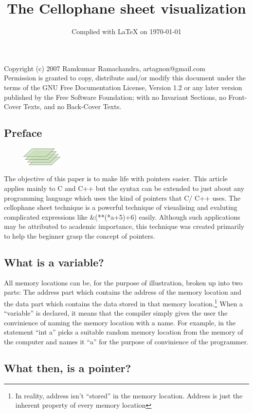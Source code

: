 \documentclass[10pt,twoside]{article}
\begin{document}
\title{The Cellophane sheet visualization}
\date{Complied with \LaTeX{} on \today}
\maketitle
\begin{center}
{\scriptsize Copyright (c) 2007 Ramkumar Ramachandra,
artagnon@gmail.com\\ Permission is granted to copy, distribute and/or
modify this document under the terms of the GNU Free Documentation
License, Version 1.2 or any later version published by the Free
Software Foundation; with no Invariant Sections, no Front-Cover Texts,
and no Back-Cover Texts.}
\end{center}

\subsection*{Preface}

\begin{figure}
\includegraphics[width=20mm]{res/logo.pdf}
\end{figure}

The objective of this paper is to make life with pointers easier. This article
applies mainly to C and C++ but the syntax can be extended to just about any
programming language which uses the kind of pointers that C/ C++ uses. The
cellophane sheet technique is a powerful technique of visualising and evaluting
complicated expressions like \&(**(*a+5)+6) easily. Although such applications
may be attributed to academic importance, this technique was created primarily
to help the beginner grasp the concept of pointers.


\subsection*{What is a variable?}
All memory locations can be, for the purpose of illustration, broken up into two
parts: The address part which contains the address of the memory location and
the data part which contains the data stored in that memory
location.\footnote{In reality, address isn't ``stored'' in the memory location.
Address is just the inherent property of every memory location} When a
``variable'' is declared, it means that the compiler simply gives the user the
convinience of naming the memory location with a name. For example, in the
statement ``int a'' picks a suitable random memory location from the memory of
the computer and names it ``a'' for the purpose of convinience of the
programmer.  \newpage \subsection*{What then, is a pointer?}
\end{document}
